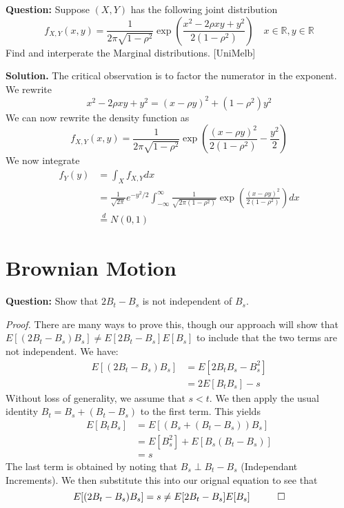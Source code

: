 \documentclass{article}
\begin{document}
\begin{tcolorbox}[colframe=black,colback=gray!5,boxrule=0.5pt]
\textbf{Question:} Suppose $(X,Y)$ has the following joint distribution
$$f_{X,Y}(x,y) = \frac{1}{2\pi\sqrt{1-\rho^2}}\exp\left(\frac{x^2 - 2\rho xy + y^2}{2(1-\rho^2)}\right)\quad x\in\mathbb{R},y\in\mathbb{R}$$
Find and interperate the Marginal distributions. [UniMelb]
\end{tcolorbox}
\textbf{Solution.} The critical observation is to factor the numerator in the exponent. We rewrite $$x^2 -2\rho xy + y^2 = (x-\rho y)^2 + (1-\rho^2)y^2$$
We can now rewrite the density function as
$$f_{X,Y}(x,y) = \frac{1}{2\pi\sqrt{1-\rho^2}}\exp\left(\frac{(x-\rho y)^2}{2(1-\rho^2)} - \frac{y^2}{2}\right)$$
We now integrate
\begin{align*}
    f_Y(y) &= \int_{X} f_{X,Y}dx \\
    &= \frac{1}{\sqrt{2\pi}}e^{-y^2/2}\int_{-\infty}^{\infty} \frac{1}{\sqrt{2\pi(1-\rho^2)}}\exp\left(\frac{(x-\rho y)^2}{2(1-\rho^2)}\right)dx \\
    &\stackrel{d}{=} N(0,1)
\end{align*} 


\newpage
\section{Brownian Motion}

\begin{tcolorbox}[colframe=black,colback=gray!5,boxrule=0.5pt]
\textbf{Question:} Show that $2B_{t} - B_s$ is not independent of $B_s$. \cite{Fima}
\end{tcolorbox}
\textit{Proof.} There are many ways to prove this, though our approach will show that $E[(2B_t-B_s)B_s]\neq E[2B_t-B_s] E[B_s]$ to include that the two terms are not independent. We have: 
\begin{align*}
    E[(2B_t-B_s)B_s] &= E[2B_tB_s - B_s^2] \\
    &= 2E[B_t B_s] - s
\end{align*}
Without loss of generality, we assume that $s<t$. We then apply the usual identity $B_t = B_s + (B_t - B_s)$ to the first term. This yields
\begin{align*}
    E[B_t B_s] &= E[(B_s + (B_t - B_s))B_s] \\
    &=E[B_s^2] + E[B_s(B_t - B_s)] \\
    &= s
\end{align*}
The last term is obtained by noting that $B_s \perp B_{t} - B_s$ (Independant Increments). We then substitute this into our orignal equation to see that 
$$E[(2B_t-B_s)B_s] = s \neq E[2B_t-B_s]E[B_s] \hspace{10mm} \Box$$
\end{document}
